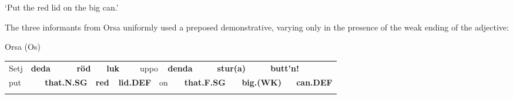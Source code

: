 \begin{styleTranslation}
‘Put the red lid on the big can.’

\end{styleTranslation}

\begin{styleBodyTextFirst}
The three informants from Orsa uniformly used a preposed demonstrative, varying only in the presence of the weak ending of the adjective: 

\end{styleBodyTextFirst}


\begin{listWWNumileveli}
\item 

\begin{styleExample}
Orsa (Os)

\end{styleExample}

\end{listWWNumileveli}

\begin{tabular}{llllllllllllllll}
\lsptoprule
Setj & \multicolumn{2}{l}{{\bfseries deda}

} & \multicolumn{2}{l}{{\bfseries röd}

} & \multicolumn{2}{l}{{\bfseries luk}

} & \multicolumn{2}{l}{uppo

} & \multicolumn{2}{l}{{\bfseries denda}

} & \multicolumn{2}{l}{{\bfseries stur(a)}

} & \multicolumn{2}{l}{{\bfseries butt’n!}

} & \\
\multicolumn{2}{l}{put

} & \multicolumn{2}{l}{{\bfseries that.N.SG}

} & \multicolumn{2}{l}{{\bfseries red}

} & \multicolumn{2}{l}{{\bfseries lid.DEF}

} & \multicolumn{2}{l}{on

} & \multicolumn{2}{l}{{\bfseries that.F.SG}

} & \multicolumn{2}{l}{{\bfseries big.(WK)}

} & \multicolumn{2}{l}{{\bfseries can.DEF}

}\\
\lspbottomrule
\end{tabular}


